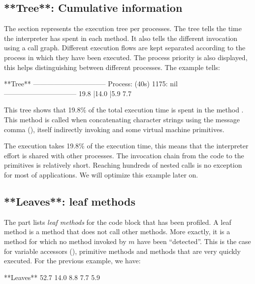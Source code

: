 \documentclass[a4paper,10pt,twoside]{book}
\begin{document}
\subsection{**Tree**: Cumulative information}

The  section represents the execution tree per processes. The tree tells the time the \pharo interpreter has spent in each method. It also tells  the different invocation using a call graph. Different execution flows are kept separated according to the process in which they have been executed. The process priority is also displayed, this helps distinguishing between different processes. The example tells:

\begin{code}
**Tree**
--------------------------------
Process: (40s)  1175: nil
--------------------------------
19.8%
  |14.0%
  |5.9%
7.7%
\end{code}

This tree shows that 19.8\% of the total execution time is spent in the method . This method is called when concatenating character strings using the message comma (\ct{,}), itself indirectly invoking  and some virtual machine primitives.

The execution takes 19.8\% of the execution time, this means that the interpreter effort is shared with other processes. The invocation chain from the code to the primitives is relatively short. Reaching hundreds of nested calls is no exception for most of applications. We will optimize this example later on.


\subsection{**Leaves**: leaf methods}

The  part lists \emph{leaf methods} for the code block that has been profiled. A leaf method is a method that does not call other methods. More exactly, it is a method  for which no method invoked by $m$ have been ``detected''. This is the case for variable accessors (\eg  {}), primitive methods and methods that are very quickly executed. For the previous example, we have:

\begin{code}
**Leaves**
52.7%
14.0%
8.8%
7.7%
5.9%
\end{code}
\end{document}
